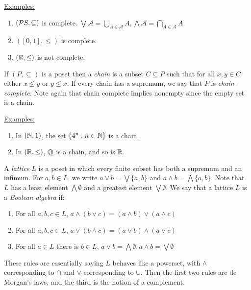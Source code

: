 \documentclass[10pt,a4paper]{article}
\begin{document}
\hspace*{-1em}\underline{Examples:}
\begin{enumerate}
\item $(\mathcal{P} S, \subseteq)$ is complete. $\bigvee \mathcal{A} = \bigcup_{A \in \mathcal{A}} A, \bigwedge \mathcal{A} = \bigcap_{A \in \mathcal{A}} A$.
\item $([0,1], \leq)$ is complete.
\item $(\mathbb{R}, \leq)$ is not complete.
\end{enumerate}
If $(P, \subseteq)$ is a poset then a \emph{chain} is a subset $C \subseteq P$ such that for all $x, y \in C$ either $x \leq y$ or $y \leq x$. If every chain has a supremum, we say that $P$ is \emph{chain-complete.} Note again that chain complete implies nonempty since the empty set is a chain.

\hspace*{-1em}\underline{Examples:}
\begin{enumerate}
\item In $(\mathbb{N},1)$, the set $\{4^n : n \in \mathbb{N}\}$ is a chain.
\item In $(\mathbb{R}, \leq)$, $\mathbb{Q}$ is a chain, and so is $\mathbb{R}$.
\end{enumerate}

A \emph{lattice} $L$ is a poset in which every finite subset has both a supremum and an infimum. For $a, b \in L$, we write $a \vee b = \bigvee \{a, b\}$ and $a \wedge b = \bigwedge \{a, b\}$. Note that $L$ has a least element $\bigwedge \emptyset$ and a greatest element $\bigvee \emptyset$. We say that a lattice $L$ is a \emph{Boolean algebra} if:
\begin{enumerate}
\item For all $a,b,c \in L$, $a \wedge (b \vee c) = (a \wedge b)\vee(a \wedge c)$
\item For all $a,b,c \in L$, $a \vee (b \wedge c) = (a \vee b) \wedge (a \vee c)$
\item For all $a \in L$ there is $b \in L$, $a \vee b = \bigwedge \emptyset, a \wedge b = \bigvee \emptyset$
\end{enumerate}
These rules are essentially saying $L$ behaves like a powerset, with $\wedge$ corresponding to $\cap$ and $\vee$ corresponding to $\cup$. Then the first two rules are de Morgan's laws, and the third is the notion of a complement.
\end{document}
